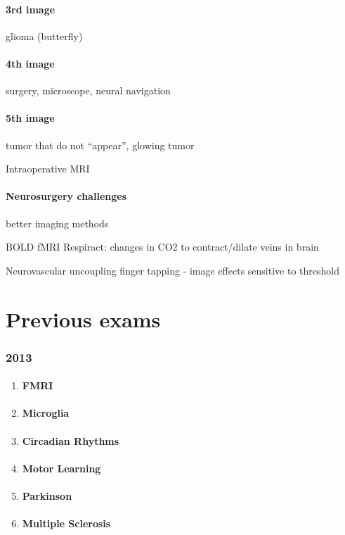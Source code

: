 \documentclass[12pt,article,oneside,a4paper]{memoir}
\begin{document}
\paragraph{3rd image} glioma (butterfly)
\paragraph{4th image} surgery, microscope, neural navigation
\paragraph{5th image} tumor that do not ``appear'', glowing tumor

Intraoperative MRI

\paragraph{Neurosurgery challenges} better imaging methods

BOLD fMRI
Respiract: changes in CO2 to contract/dilate veins in brain

Neurovascular uncoupling
finger tapping - image effects
sensitive to threshold


\newpage


\section{Previous exams}

\subsubsection{2013}
\begin{enumerate}
\item \paragraph{FMRI}
\item \paragraph{Microglia}
\item \paragraph{Circadian Rhythms}
\item \paragraph{Motor Learning}
\item \paragraph{Parkinson}
\item \paragraph{Multiple Sclerosis}
\end{enumerate}
\end{document}
